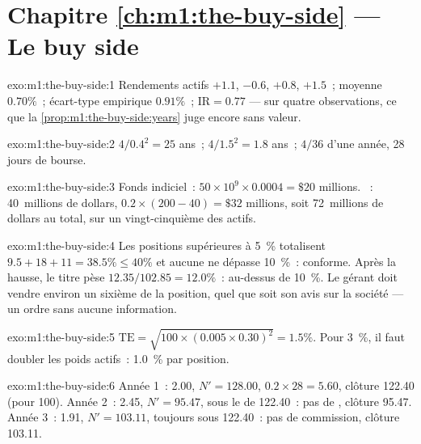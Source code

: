 \section*{Chapitre \ref{ch:m1:the-buy-side} --- Le buy side}

\begin{solution}{exo:m1:the-buy-side:1}
Rendements actifs $+1.1$, $-0.6$, $+0.8$, $+1.5$~; moyenne $0.70\%$~; écart-type
empirique $0.91\%$~; $\mathrm{IR} = 0.77$ --- sur quatre observations, ce que
la \cref{prop:m1:the-buy-side:years} juge encore sans valeur.
\end{solution}

\begin{solution}{exo:m1:the-buy-side:2}
$4/0.4^2 = 25$ ans~; $4/1.5^2 = 1.8$ ans~; $4/36$ d'une année, 28 jours
de bourse.
\end{solution}

\begin{solution}{exo:m1:the-buy-side:3}
Fonds indiciel~: $50 \times 10^9 \times 0.0004 = \$20$ millions. ~:
 40~millions de dollars,  $0.2 \times (200 - 40) = \$32$ millions,
soit 72~millions de dollars au total, sur un vingt-cinquième des actifs.
\end{solution}

\begin{solution}{exo:m1:the-buy-side:4}
Les positions supérieures à 5~\% totalisent $9.5 + 18 + 11 = 38.5\% \le 40\%$ et aucune ne dépasse
10~\%~: conforme. Après la hausse, le titre pèse $12.35/102.85 = 12.0\%$~:
au-dessus de 10~\%. Le gérant doit vendre environ un sixième de la position, quel que soit son
avis sur la société --- un ordre sans aucune information.
\end{solution}

\begin{solution}{exo:m1:the-buy-side:5}
$\mathrm{TE} = \sqrt{100 \times (0.005\times0.30)^2} = 1.5\%$. Pour 3~\%, il faut doubler
les poids actifs~: 1.0~\% par position.
\end{solution}

\begin{solution}{exo:m1:the-buy-side:6}
Année 1~:  2.00, $N' = 128.00$,  $0.2\times28 = 5.60$,
clôture 122.40 (pour 100). Année 2~:  2.45, $N' = 95.47$, sous le
 de 122.40~: pas de , clôture 95.47. Année 3~:  1.91, $N' =
103.11$, toujours sous 122.40~: pas de commission, clôture 103.11.
\end{solution}


